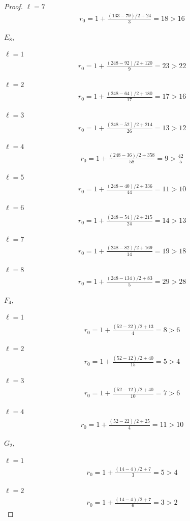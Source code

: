 \documentclass[11pt,a4paper,usenames,dvipsnames,reqno]{amsart}
\numberwithin{equation}{section}
\theoremstyle{definition}
\theoremstyle{remark}
\begin{document}
{\begin{proof}
$\ell=7$
\begin{align*}
    r_0=1+\frac{(133-79)/2+24}{3}=18>16
\end{align*}

$E_8$, 

$\ell=1$
\begin{align*}
    r_0=1+\frac{(248-92)/2+120}{9}=23>22
\end{align*}

$\ell=2$
\begin{align*}
    r_0=1+\frac{(248-64)/2+180}{17}=17>16
\end{align*}

$\ell=3$
\begin{align*}
    r_0=1+\frac{(248-52)/2+214}{26}=13>12
\end{align*}

$\ell=4$
\begin{align*}
    r_0=1+\frac{(248-36)/2+358}{58}=9>\frac{42}{5}
\end{align*}

$\ell=5$
\begin{align*}
    r_0=1+\frac{(248-40)/2+336}{44}=11>10
\end{align*}

$\ell=6$
\begin{align*}
    r_0=1+\frac{(248-54)/2+215}{24}=14>13
\end{align*}

$\ell=7$
\begin{align*}
    r_0=1+\frac{(248-82)/2+169}{14}=19>18
\end{align*}

$\ell=8$
\begin{align*}
    r_0=1+\frac{(248-134)/2+83}{5}=29>28
\end{align*}

$F_4$, 

$\ell=1$
\begin{align*}
    r_0=1+\frac{(52-22)/2+13}{4}=8>6
\end{align*}

$\ell=2$
\begin{align*}
    r_0=1+\frac{(52-12)/2+40}{15}=5>4
\end{align*}

$\ell=3$
\begin{align*}
    r_0=1+\frac{(52-12)/2+40}{10}=7>6
\end{align*}

$\ell=4$
\begin{align*}
    r_0=1+\frac{(52-22)/2+25}{4}=11>10
\end{align*}

$G_2$, 

$\ell=1$
\begin{align*}
    r_0=1+\frac{(14-4)/2+7}{3}=5>4
\end{align*}

$\ell=2$
\begin{align*}
    r_0=1+\frac{(14-4)/2+7}{6}=3>2
\end{align*}

\end{proof}
}



\end{document}

